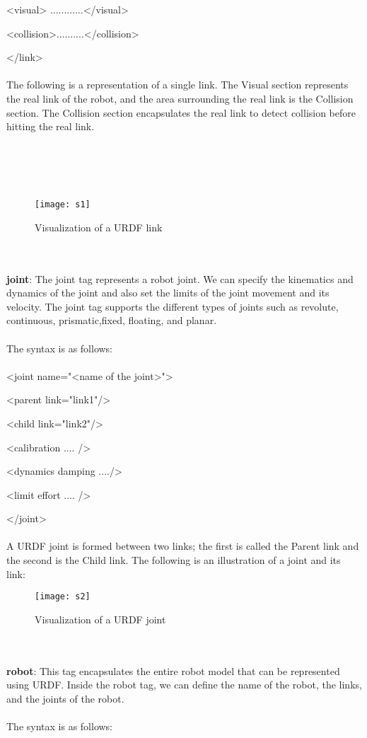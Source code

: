 	<visual> ............</visual>
	
	<collision>..........</collision>
	
	</link>
	\\\\The following is a representation of a single link. The Visual section represents 
	the real link of the robot, and the area surrounding the real link is the Collision 
	section. The Collision section encapsulates the real link to detect collision before 
	hitting the real link.\\\\\\\\\\
	\begin{figure}[h]
		\centering
		\texttt{[image: s1]}
		\caption{Visualization of a URDF link}
		\label{fig:s1}
	\end{figure}
	\\\\\textbf{joint}: The joint tag represents a robot joint. We can specify the kinematics and dynamics of the joint and also set the limits of the joint movement and its velocity. The joint tag supports the different types of joints such as revolute, continuous, prismatic,fixed, floating, and planar.
	\\\\The syntax is as follows:\\\\
	
	<joint name="<name of the joint>">
	
	<parent link="link1"/>
	
	<child link="link2"/>
	
	<calibration .... />
	
	<dynamics damping ..../>
	
	<limit effort .... />
	
	</joint>
	\\\\A URDF joint is formed between two links; the first is called the Parent link and the second is the Child link. The following is an illustration of a joint and its link:\\
	\begin{figure}[h]
		\centering
		\texttt{[image: s2]}
		\caption{Visualization of a URDF joint}
		\label{fig:s2}
	\end{figure}
	\\\\\textbf{robot}: This tag encapsulates the entire robot model that can be represented using URDF. Inside the robot tag, we can define the name of the robot, the links, and the joints of the robot.
	\\\\The syntax is as follows:\\
	
